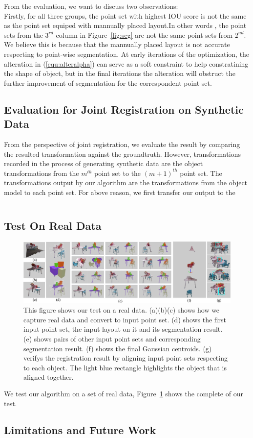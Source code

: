 From the evaluation, we want to discuss two observations:\\
Firstly, for all three groups, the point set with highest IOU score is not the same as the point set equiped with mannually placed layout.In other words , the point sets from the $3^{rd}$ column in Figure~\ref{fig:seg} are not the same point sets from $2^{nd}$. We believe this is because that the mannually placed layout is not accurate respecting to point-wise segmentation. At early iterations of the optimization, the alteration in (\ref{equ:alteralpha}) can serve as a soft constraint to help constratining the shape of object, but in the final iterations the alteration will obstruct the further improvement of segmentation for the correspondent point set. 
\subsection{Evaluation for Joint Registration on Synthetic Data}
From the perspective of joint registration, we evaluate the result by comparing the resulted transformation against the groundtruth. However, transformations recorded in the process of generating synthetic data are the object transformations from the $m^{th}$ point set to the $(m+1)^{th}$ point set. The transformations output by our algorithm are the transformations from the object model to each point set. For above reason, we first transfer our output to the  
\begin{table}[!hbp]
\centering
\begin{tabular}{c l}
		\hline
\end{tabular}
\end{table}
\subsection{Test On Real Data}
\begin{figure}[htb]
	\centering
	\includegraphics[width=\linewidth]{images/realdata/realdata}
	\caption{\label{fig:realdata}This figure shows our test on a real data. (a)(b)(c) shows how we capture real data and convert to input point set. (d) shows the first input point set, the input layout on it and its segmentation result. (e) shows pairs of other input point sets and corresponding segmentation result. (f) shows the final Gaussian centroids. (g) verifys the registration result by aligning input point sets respecting to each object. The light blue rectangle highlights the object that is aligned together. }
\end{figure}
We test our algorithm on a set of real data, Figure~{\ref{fig:realdata}} shows the complete of our test. 
\subsection{Limitations and Future Work}
